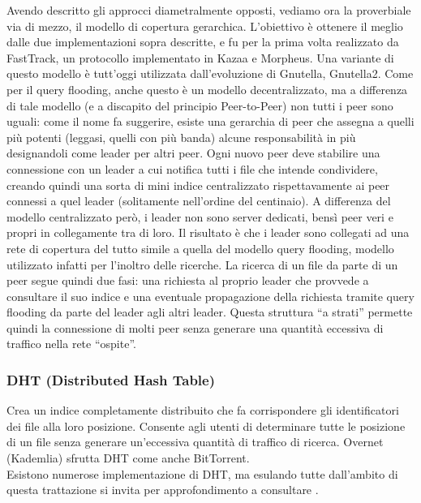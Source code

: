 Avendo descritto gli approcci diametralmente opposti, vediamo ora la proverbiale via di mezzo, il modello di copertura gerarchica. L'obiettivo è ottenere il meglio dalle due implementazioni sopra descritte, e fu per la prima volta realizzato da FastTrack, un protocollo implementato in Kazaa e Morpheus. Una variante di questo modello è tutt'oggi utilizzata dall'evoluzione di Gnutella, Gnutella2. Come per il query flooding, anche questo è un modello decentralizzato, ma a differenza di tale modello (e a discapito del principio Peer-to-Peer) non tutti i peer sono uguali: come il nome fa suggerire, esiste una gerarchia di peer che assegna a quelli più potenti (leggasi, quelli con più banda) alcune responsabilità in più designandoli come leader per altri peer. Ogni nuovo peer deve stabilire una connessione con un leader a cui notifica tutti i file che intende condividere, creando quindi una sorta di mini indice centralizzato rispettavamente ai peer connessi a quel leader (solitamente nell'ordine del centinaio). A differenza del modello centralizzato però, i leader non sono server dedicati, bensì peer veri e propri in collegamente tra di loro. Il risultato è che i leader sono collegati ad una rete di copertura del tutto simile a quella del modello query flooding, modello utilizzato infatti per l'inoltro delle ricerche. La ricerca di un file da parte di un peer segue quindi due fasi: una richiesta al proprio leader che provvede a consultare il suo indice e una eventuale propagazione della richiesta tramite query flooding da parte del leader agli altri leader. Questa struttura ``a strati'' permette quindi la connessione di molti peer senza generare una quantità eccessiva di traffico nella rete ``ospite''.

\subsubsection{DHT (Distributed Hash Table)}\label{dht-distributed-hash-table}

Crea un indice completamente distribuito che fa corrispondere gli identificatori dei file alla loro posizione. Consente agli utenti di determinare tutte le posizione di un file senza generare un'eccessiva quantità di traffico di ricerca. Overnet (Kademlia) sfrutta DHT come anche BitTorrent.\\
Esistono numerose implementazione di DHT, ma esulando tutte dall'ambito di questa trattazione si invita per approfondimento a consultare \cite{distributed-computing}.
